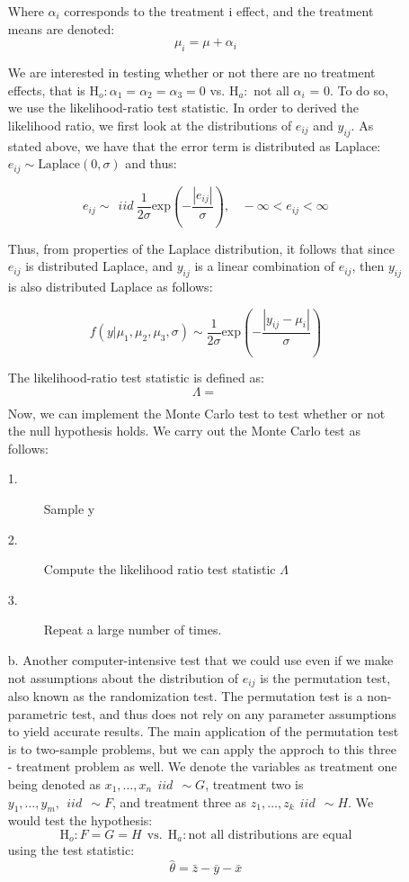 \documentclass[12pt]{article}
\begin{document}
\begin{description}
\begin{itemize}
Where $\alpha_i$ corresponds to the treatment i effect, and the treatment means are denoted:
\[\mu_i = \mu +  \alpha_i\]

We are interested in testing whether or not there are no treatment effects, that is $\text{H}_o: \alpha_1 = \alpha_2 = \alpha_3 = 0$ vs. $\text{H}_a:$ not all $\alpha_i$ = 0. To do so, we use the likelihood-ratio test statistic. In order to derived the likelihood ratio, we first look at the distributions of $e_{ij}$ and $y_{ij}$. As stated above, we have that the error term is distributed as Laplace: $e_{ij} \sim \text{Laplace}(0, \sigma)$ and thus: 

\[e_{ij} \sim \ \ iid \ \frac{1}{2\sigma} \mathrm{exp} \left(- \frac{|e_{ij}|}{\sigma} \right), \ \ \ \ -\infty < e_{ij} < \infty\]

Thus, from properties of the Laplace distribution, it follows that since $e_{ij}$ is distributed Laplace, and $y_{ij}$ is a linear combination of $e_{ij}$, then $y_{ij}$ is also distributed Laplace as follows:

\[f(y|\mu_1, \mu_2, \mu_3, \sigma) \sim \frac{1}{2\sigma} \mathrm{exp} \left( -\frac{|y_{ij} - \mu_i|}{\sigma}\right)  \]

The likelihood-ratio test statistic is defined as:
\[\Lambda = \frac{}{}\]
Now, we can implement the Monte Carlo test to test whether or not the null hypothesis holds. We carry out the Monte Carlo test as follows:
\begin{description}
\item[1.] Sample y
\item[2.] Compute the likelihood ratio test statistic $\Lambda$
\item[3.] Repeat a large number of times. 
\end{description}
\item[b.] Another computer-intensive test that we could use even if we make not assumptions about the distribution of $e_{ij}$ is the permutation test, also known as the randomization test. The permutation test is a non-parametric test, and thus does not rely on any parameter assumptions to yield accurate results. The main application of the permutation test is to two-sample problems, but we can apply the approch to this three - treatment problem as well. We denote the variables as treatment one being denoted as $x_1, \dots, x_n  \ \ iid \ \ \sim G$, treatment two is $y_1, \dots, y_m, \ \ iid \ \ \sim F$, and treatment three as $z_1, \dots, z_k \ \ iid \ \ \sim H$. We would test the hypothesis:
\[\text{H}_o: F = G = H \ \ \text{vs.} \ \ \text{H}_a: \text{not all distributions are equal}\]
using the test statistic:
\[\hat{\theta} = \bar{z} - \bar{y} - \bar{x}\]


\end{itemize}
\end{description}
\end{document}
